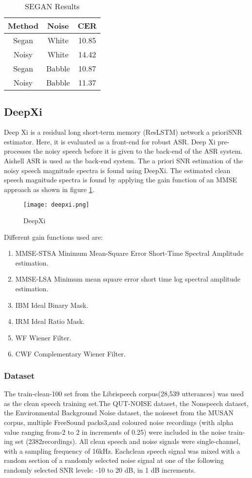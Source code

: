 \documentclass[12pt]{article}
\begin{document}
\begin{table} [h!]
       \centering
		\caption{ SEGAN Results }
\label{tab: SEGAN Results}
\begin{tabular}{ | c || c || c | }
\hline Method & Noise & CER\\ 
\hline
\hline Segan & White & 10.85 \\
\hline Noisy & White & 14.42 \\
\hline Segan & Babble & 10.87 \\
\hline Noisy & Babble & 11.37\\
\hline
\end{tabular}
\end{table}


\subsection{DeepXi}
Deep Xi is a residual long short-term memory (ResLSTM) network a prioriSNR estimator. Here, it is evaluated as a front-end for robust ASR. Deep Xi pre-processes the noisy speech before it is given to the back-end of the ASR system. Aishell ASR is used as the back-end system.
The a priori SNR estimation of the noisy speech magnitude spectra is found using DeepXi. The estimated clean speech magnitude spectra is found by applying the gain function of an MMSE approach as shown in figure \ref{fig:DeepXi}.
\begin{figure}[H]
\centering
\texttt{[image: deepxi.png]}
\caption{DeepXi}
\label{fig:DeepXi}
\end{figure}

Different gain functions used are:
\begin{enumerate}
\item MMSE-STSA Minimum Mean-Square Error Short-Time Spectral Amplitude estimation.
\item MMSE-LSA Minimum mean square error short time log spectral amplitude estimation.
\item IBM Ideal Binary Mask.
\item IRM Ideal Ratio Mask.
\item WF Wiener Filter.
\item CWF Complementary Wiener Filter.
\end{enumerate}

\subsubsection{Dataset}
The train-clean-100 set from the Librispeech corpus(28,539 utterances) was used as the clean speech training set.The QUT-NOISE dataset, the Nonspeech dataset, the Environmental Background Noise dataset, the noiseset from the MUSAN corpus, multiple FreeSound packs3,and coloured noise recordings (with alpha value ranging from-2 to 2 in increments of 0.25) were included in the noise train-ing set (2382recordings). All clean speech and noise signals  were single-channel, with a sampling frequency of 16kHz. Eachclean speech signal was mixed with a random section of a randomly selected noise signal at one of the following randomly selected SNR levels: -10 to 20 dB, in 1 dB increments.
\end{document}
